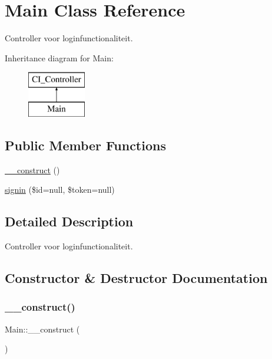 \hypertarget{class_main}{}\section{Main Class Reference}
\label{class_main}


Controller voor loginfunctionaliteit.  


Inheritance diagram for Main\+:\begin{figure}[H]
\begin{center}
\leavevmode
\includegraphics[height=2.000000cm]{class_main}
\end{center}
\end{figure}
\subsection*{Public Member Functions}
\begin{DoxyCompactItemize}
\item 
\mbox{\hyperlink{class_main_a7db8d678f9d0bf824216c257270bfdc0}{\+\_\+\+\_\+construct}} ()
\item 
\mbox{\hyperlink{class_main_abe69faf1748e8be1e467c98090074f7e}{signin}} (\$id=null, \$token=null)
\end{DoxyCompactItemize}


\subsection{Detailed Description}
Controller voor loginfunctionaliteit. 

\subsection{Constructor \& Destructor Documentation}
\mbox{\label{class_main_a7db8d678f9d0bf824216c257270bfdc0}} 
\subsubsection{\texorpdfstring{\+\_\+\+\_\+construct()}{\_\_construct()}}
{\footnotesize\ttfamily Main\+::\+\_\+\+\_\+construct (\begin{DoxyParamCaption}{ }\end{DoxyParamCaption})}

